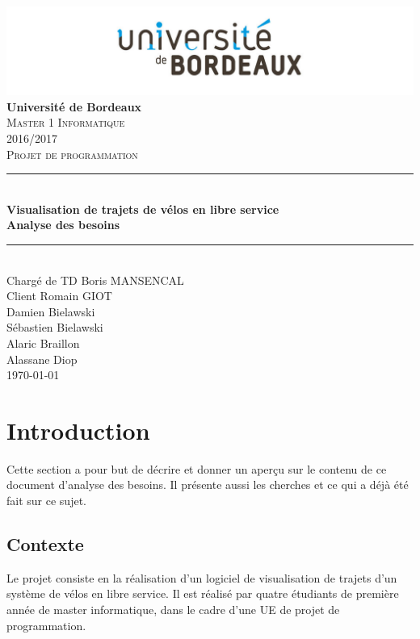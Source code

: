 \documentclass[12pt]{article}
\begin{document}
	\begin{titlepage}
		\includegraphics[scale=0.2]{logo_bordeaux.png}\\
		\centering
		{\LARGE \bfseries Université de Bordeaux}\\ [2cm]
		\textsc{\Large Master 1 Informatique}\\ [0,3cm]
		\textsc{\Large 2016/2017}\\ [1,5cm]

		\textsc{\Large Projet de programmation}\\ [1.5cm]


		\rule{16cm}{1mm}\\ [0,7cm]
		{ \huge \bfseries Visualisation de trajets de vélos en libre service} \\[0,5cm]
		{ \huge \bfseries Analyse des besoins}\\ [0,7cm]
		\rule{16cm}{1mm}\\ [1cm]

		{\Large Chargé de TD Boris MANSENCAL }\\ [0,3cm]
		{\Large Client Romain GIOT }\\ [1cm]

		{\Large Damien Bielawski }\\ [0,3cm]
		{\Large Sébastien Bielawski }\\[0,3cm]
		{\Large Alaric Braillon }\\ [0,3cm]
		{\Large Alassane Diop }\\ [2cm]
		\Large\today

	\end{titlepage}

	\tableofcontents \newpage

	\section{Introduction}
		Cette section a pour but de décrire et donner un aperçu sur le contenu de ce document d'analyse des besoins. Il présente aussi les cherches et ce qui a déjà été fait sur ce sujet.

		\subsection{Contexte}
			Le projet consiste en la réalisation d’un logiciel de visualisation de trajets d'un système de vélos en libre service. 
			Il est réalisé par quatre étudiants de première année de master informatique, dans le cadre d'une UE de projet de programmation.
\end{document}
